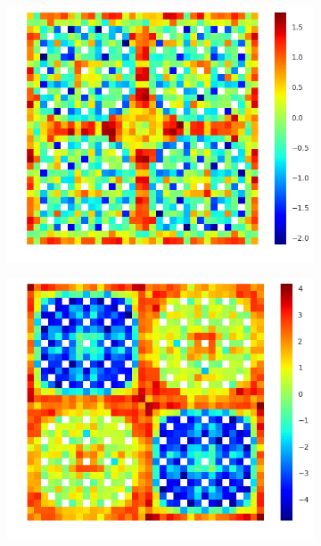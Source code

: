 \begin{figure}[h!]
\begin{subfigure}{.33\textwidth}
\end{subfigure}%
\begin{subfigure}{.33\textwidth}
  \centering
  \includegraphics[width=\linewidth]{figures/quantification/2x2/infinite-capt-err-70}
  \caption{}
  \label{fig:chap8-2x2-inf-capt-70}
\end{subfigure}
\begin{subfigure}{.33\textwidth}
  \centering
  \includegraphics[width=\linewidth]{figures/quantification/2x2/null-capt-err-2}
  \caption{}
  \label{fig:chap8-2x2-null-capt-2}

\end{subfigure}
\end{figure}
